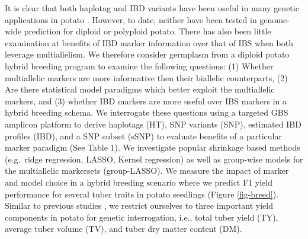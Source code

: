 \begin{tcolorbox}
\begin{figure}[H]
\begin{minipage}[t]{0.50\linewidth}
{

}

\end{minipage}%

\end{figure}

\end{tcolorbox}

It is clear that both haplotag and IBD variants have been useful in many
genetic applications in potato \autocite{Korontzis2020,Amadeu2021}.
However, to date, neither have been tested in genome-wide prediction for
diploid or polyploid potato. There has also been little examination at
benefits of IBD marker information over that of IBS when both leverage multiallelism. We therefore consider germplasm from a diploid potato
hybrid breeding program to examine the following questions: (1) Whether
multiallelic markers are more informative then their biallelic
counterparts, (2) Are there statistical model paradigms which better
exploit the multiallelic markers, and (3) whether IBD markers are more
useful over IBS markers in a hybrid breeding schema. We interrogate
these questions using a targeted GBS amplicon platform to derive
haplotags (HT), SNP variants (SNP), estimated IBD profiles (IBD), and a
SNP subset (sSNP) to evaluate benefits of a particular marker paradigm
(See Table 1). We investigate popular shrinkage based methods
(e.g.~ridge regression, LASSO, Kernel regression) as well as group-wise
models for the multiallelic markersets (group-LASSO). We measure the
impact of marker and model choice in a hybrid breeding scenario where we
predict F1 yield performance for several tuber traits in potato
seedlings (Figure \ref{fig-breed}). Similar to previous studies
\autocite{Adams2023}, we restrict ourselves to three important yield
components in potato for genetic interrogation, i.e., total tuber yield
(TY), average tuber volume (TV), and tuber dry matter content (DM).

